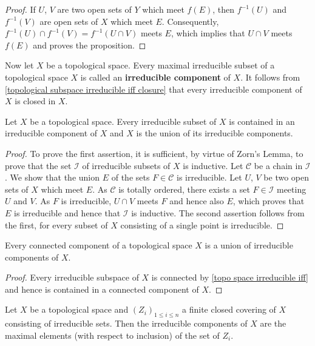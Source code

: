 \begin{proof}
If $U$, $V$ are two open sets of $Y$ which meet $f(E)$, then $f^{-1}(U)$ and $f^{-1}(V)$ are open sets of $X$ which meet $E$. Consequently, $f^{-1}(U)\cap f^{-1}(V)=f^{-1}(U\cap V)$ meets $E$, which implies that $U\cap V$ meets $f(E)$ and proves the proposition.
\end{proof}
Now let $X$ be a topological space. Every maximal irreducible subset of a topological space $X$ is called an \textbf{irreducible component} of $X$. It follows from \cref{topological subspace irreducible iff closure} that every irreducible component of $X$ is closed in $X$.
\begin{proposition}\label{topo space irreducible component prop}
Let $X$ be a topological space. Every irreducible subset of $X$ is contained in an irreducible component of $X$ and $X$ is the union of its irreducible components.
\end{proposition}
\begin{proof}
To prove the first assertion, it is sufficient, by virtue of Zorn's Lemma, to prove that the set $\mathcal{I}$ of irreducible subsets of $X$ is inductive. Let $\mathcal{C}$ be a chain in $\mathcal{I}$. We show that the union $E$ of the sets $F\in\mathcal{C}$ is irreducible. Let $U$, $V$ be two open sets of $X$ which meet $E$. As $\mathcal{C}$ is totally ordered, there exists a set $F\in\mathcal{I}$ meeting $U$ and $V$. As $F$ is irreducible, $U\cap V$ meets $F$ and hence also $E$, which proves that $E$ is irreducible and hence that $\mathcal{I}$ is inductive. The second assertion follows from the first, for every subset of $X$ consisting of a single point is irreducible.
\end{proof}
\begin{corollary}\label{topo space connected component union of irre component}
Every connected component of a topological space $X$ is a union of irreducible components of $X$.
\end{corollary}
\begin{proof}
Every irreducible subspace of $X$ is connected by \cref{topo space irreducible iff} and hence is contained in a connected component of $X$.
\end{proof}
\begin{proposition}\label{topo space finite closed irreducible cover}
Let $X$ be a topological space and $(Z_i)_{1\leq i\leq n}$ a finite closed covering of $X$ consisting of irreducible sets. Then the irreducible components of $X$ are the maximal elements (with respect to inclusion) of the set of $Z_i$.
\end{proposition}
